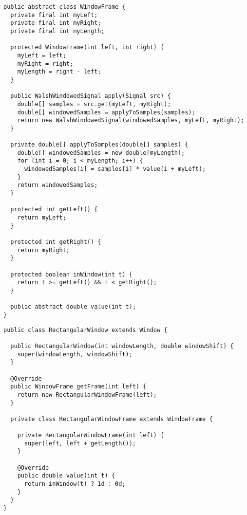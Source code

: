 \begin{lstlisting}[caption={Экземпляр оконной функции}]
public abstract class WindowFrame {
  private final int myLeft;
  private final int myRight;
  private final int myLength;

  protected WindowFrame(int left, int right) {
    myLeft = left;
    myRight = right;
    myLength = right - left;
  }

  public WalshWindowedSignal apply(Signal src) {
    double[] samples = src.get(myLeft, myRight);
    double[] windowedSamples = applyToSamples(samples);
    return new WalshWindowedSignal(windowedSamples, myLeft, myRight);
  }

  private double[] applyToSamples(double[] samples) {
    double[] windowedSamples = new double[myLength];
    for (int i = 0; i < myLength; i++) {
      windowedSamples[i] = samples[i] * value(i + myLeft);
    }
    return windowedSamples;
  }

  protected int getLeft() {
    return myLeft;
  }

  protected int getRight() {
    return myRight;
  }

  protected boolean inWindow(int t) {
    return t >= getLeft() && t < getRight();
  }

  public abstract double value(int t);
}
\end{lstlisting}

\begin{lstlisting}[caption={Прямоугольное окно}]
public class RectangularWindow extends Window {

  public RectangularWindow(int windowLength, double windowShift) {
    super(windowLength, windowShift);
  }

  @Override
  public WindowFrame getFrame(int left) {
    return new RectangularWindowFrame(left);
  }

  private class RectangularWindowFrame extends WindowFrame {

    private RectangularWindowFrame(int left) {
      super(left, left + getLength());
    }

    @Override
    public double value(int t) {
      return inWindow(t) ? 1d : 0d;
    }
  }
}
\end{lstlisting}